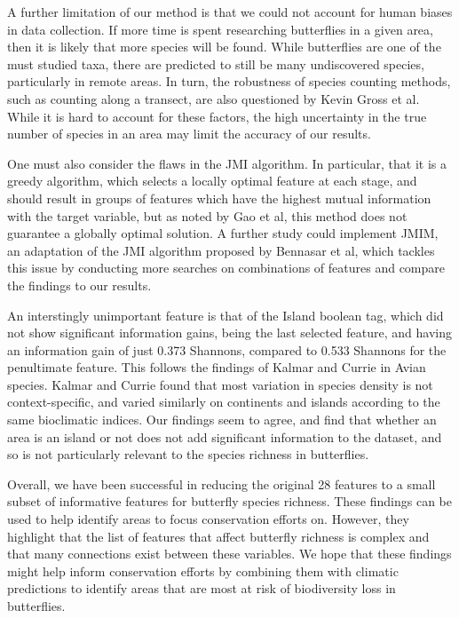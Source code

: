 \documentclass[prl,showpacs,superscriptaddress,twocolumn,longbibliography]{revtex4-1}
\begin{document}
A further limitation of our method is that we could not account for human biases in data collection. If more time is spent researching butterflies in a given area, then it is likely that more species will be found. While butterflies are one of the must studied taxa, there are predicted to still be many undiscovered species, particularly in remote areas. In turn, the robustness of species counting methods, such as counting along a transect, are also questioned by Kevin Gross et al\cite{gross_robustness_2007}. While it is hard to account for these factors, the high uncertainty in the true number of species in an area may limit the accuracy of our results.

One must also consider the flaws in the JMI algorithm. In particular, that it is a greedy algorithm, which selects a locally optimal feature at each stage, and should result in groups of features which have the highest mutual information with the target variable, but as noted by Gao et al, this method does not guarantee a globally optimal solution\cite{gao_variational_2016}.  A further study could implement JMIM, an adaptation of the JMI algorithm proposed by Bennasar et al\cite{bennasar_feature_2015}, which tackles this issue by conducting more searches on combinations of features and compare the findings to our results.

An interstingly unimportant feature is that of the Island boolean tag, which did not show significant information gains, being the last selected feature, and having an information gain of just 0.373 Shannons, compared to 0.533 Shannons for the penultimate feature. This follows the findings of Kalmar and Currie in Avian species\cite{kalmar_unified_2007}. Kalmar and Currie found that most variation in species density is not context-specific, and varied similarly on continents and islands according to the same bioclimatic indices. Our findings seem to agree, and find that whether an area is an island or not does not add significant information to the dataset, and so is not particularly relevant to the species richness in butterflies.


Overall, we have been successful in reducing the original 28 features to a small subset of informative features for butterfly species richness. These findings can be used to help identify areas to focus conservation efforts on. However, they highlight that the list of features that affect butterfly richness is complex and that many connections exist between these variables. We hope that these findings might help inform conservation efforts by combining them with climatic predictions to identify areas that are most at risk of biodiversity loss in butterflies.
\end{document}
